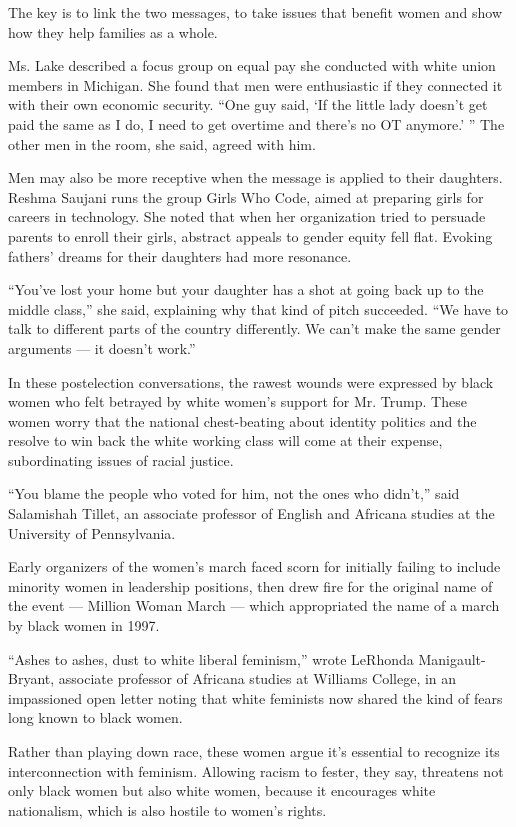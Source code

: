 The key is to link the two messages, to take issues that benefit women
and show how they help families as a whole.

Ms. Lake described a focus group on equal pay she conducted with white
union members in Michigan. She found that men were enthusiastic if they
connected it with their own economic security. ``One guy said, `If the
little lady doesn't get paid the same as I do, I need to get overtime
and there's no OT anymore.' '' The other men in the room, she said,
agreed with him.

Men may also be more receptive when the message is applied to their
daughters. Reshma Saujani runs the group Girls Who Code, aimed at
preparing girls for careers in technology. She noted that when her
organization tried to persuade parents to enroll their girls, abstract
appeals to gender equity fell flat. Evoking fathers' dreams for their
daughters had more resonance.

``You've lost your home but your daughter has a shot at going back up to
the middle class,'' she said, explaining why that kind of pitch
succeeded. ``We have to talk to different parts of the country
differently. We can't make the same gender arguments --- it doesn't
work.''

In these postelection conversations, the rawest wounds were expressed by
black women who felt betrayed by white women's support for Mr. Trump.
These women worry that the national chest-beating about identity
politics and the resolve to win back the white working class will come
at their expense, subordinating issues of racial justice.

``You blame the people who voted for him, not the ones who didn't,''
said Salamishah Tillet, an associate professor of English and Africana
studies at the University of Pennsylvania.

Early organizers of the women's march faced scorn for initially failing
to include minority women in leadership positions, then drew fire for
the original name of the event --- Million Woman March --- which
appropriated the name of a march by black women in 1997.

``Ashes to ashes, dust to white liberal feminism,'' wrote LeRhonda
Manigault-Bryant, associate professor of Africana studies at Williams
College, in an impassioned open letter noting that white feminists now
shared the kind of fears long known to black women.

Rather than playing down race, these women argue it's essential to
recognize its interconnection with feminism. Allowing racism to fester,
they say, threatens not only black women but also white women, because
it encourages white nationalism, which is also hostile to women's
rights.

